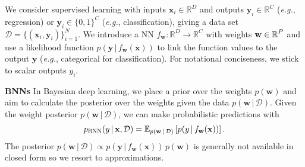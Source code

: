 \documentclass{article}
\makeatletter
\newcommand{\eg}{\textit{e.g.\@}\xspace}
\newcommand{\dataset}{\ensuremath{\mathcal{D}}}
\newcommand{\inputDomain}{\ensuremath{\mathbb{R}^{D}}}
\newcommand{\outputDomain}{\ensuremath{\mathbb{R}^{C}}}
\newcommand{\weights}{\ensuremath{\mathbf{w}}}
\newcommand{\mbf}[1]{\mathbf{#1}}
\renewcommand{\mid}{\,|\,}
\newcommand{\vx}{\mbf{x}}
\newcommand{\vy}{\mbf{y}}
\newcommand{\vw}{\mbf{w}}
\makeatother
\begin{document}

We consider supervised learning with inputs $\vx_i \in \inputDomain$ and outputs $\vy_i \in \outputDomain$ (\eg, regression) or $\vy_{i} \in \{0,1\}^{C}$ (\eg, classification),
giving a data set $\dataset = \{(\vx_{i} , \vy_{i})\}_{i=1}^{N}$.
We introduce a  NN $f_\mathbf{w}: \inputDomain \to \outputDomain$ with weights $\weights \in \R^{P}$ and use a likelihood function $p(\vy \mid f_\mathbf{w}(\vx))$
to link the function values to the output $\vy$ (\eg, categorical for classification).
For notational conciseness, we stick to scalar outputs $y_{i}$.

\textbf{BNNs}
In Bayesian deep learning, we place a prior over the weights $p(\vw)$ and aim to calculate the posterior over the weights given the data $p(\vw \mid \mathcal{D})$.
Given the weight posterior $p(\vw \mid \mathcal{D})$, we can make probabilistic predictions with
\begin{align} \label{eq-predictions}
  p_{\text{\sc BNN}}(y \mid \vx, \mathcal{D}) = \E_{p(\vw \mid \mathcal{D})} \left[ p(y \mid f_{\vw}(\vx)) \right].
\end{align}
The posterior ${p(\vw \mid \dataset) \propto p(\vy \mid f_{\weights}(\vx)) \, p(\weights)}$ is generally not available in closed form
so we resort to approximations.
\end{document}
